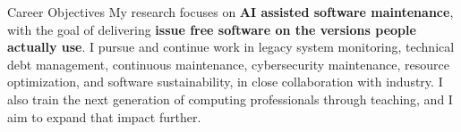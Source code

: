 \begin{rubric}{Career Objectives}
\entry*[]%
My research focuses on \textbf{AI assisted software maintenance}, with the goal of delivering
\textbf{issue free software on the versions people actually use}.
I pursue and continue work in legacy system monitoring, technical debt management,
continuous maintenance, cybersecurity maintenance, resource optimization, and software
sustainability, in close collaboration with industry.
I also train the next generation of computing professionals through teaching, and I aim to
expand that impact further.
\end{rubric}
